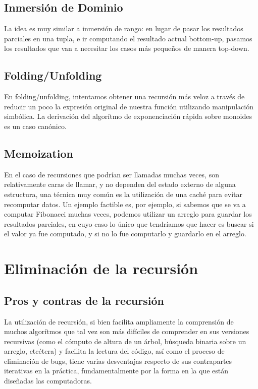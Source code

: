 \documentclass[10pt,a4paper,notitlepage]{article}
\begin{document}
\subsection{Inmersión de Dominio}

La idea es muy similar a inmersión de rango: en lugar de pasar los resultados parciales en una tupla, e ir computando el resultado actual bottom-up, pasamos los resultados que van a necesitar los casos más pequeños de manera top-down.

\subsection{Folding/Unfolding}

En folding/unfolding, intentamos obtener una recursión más veloz a través de reducir un poco la expresión original de nuestra función utilizando manipulación simbólica. La derivación del algorítmo de exponenciación rápida sobre monoides es un caso canónico.

\subsection{Memoization}

En el caso de recursiones que podrían ser llamadas muchas veces, son relativamente caras de llamar, y no dependen del estado externo de alguna estructura, una técnica muy común es la utilización de una caché para evitar recomputar datos. Un ejemplo factible es, por ejemplo, si sabemos que se va a computar Fibonacci muchas veces, podemos utilizar un arreglo para guardar los resultados parciales, en cuyo caso lo único que tendríamos que hacer es buscar si el valor ya fue computado, y si no lo fue computarlo y guardarlo en el arreglo.


\section{Eliminación de la recursión}

\subsection{Pros y contras de la recursión}

La utilización de recursión, si bien facilita ampliamente la comprensión de muchos algorítmos que tal vez son más difíciles de comprender en sus versiones recursivas (como el cómputo de altura de un árbol, búsqueda binaria sobre un arreglo, etcétera) y facilita la lectura del código, así como el proceso de eliminación de bugs, tiene varias desventajas respecto de sus contrapartes iterativas en la práctica, fundamentalmente por la forma en la que están diseñadas las computadoras.
\end{document}
